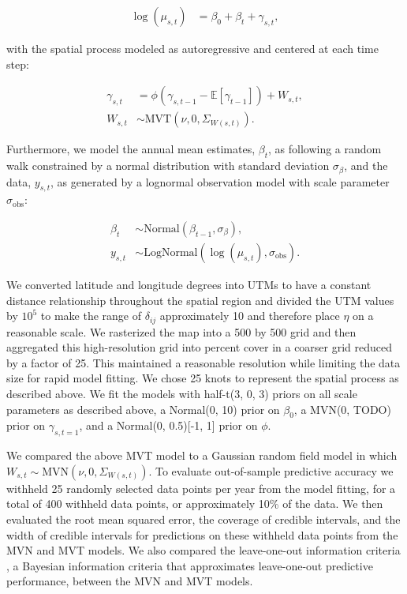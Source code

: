 \documentclass[12pt,english]{article}
\begin{document}
\begin{spacing}{1.25}
\begin{align}
  \log(\mu_{s,t}) &= \beta_0 + \beta_t + \gamma_{s,t},
  \end{align}

\noindent with the spatial process modeled as autoregressive
and centered at each time step:

\begin{align}
    \gamma_{s,t} &= \phi \left(\gamma_{s,t-1} -
      \mathbb{E}[\gamma_{t-1}]\right) + W_{s,t},\\ \label{eq:beetle-mu}
     W_{s,t} &\sim \mathrm{MVT}\left(\nu, 0, \Sigma_{W(s,t)}\right).
 \end{align}

\noindent Furthermore, we model the annual
mean estimates, $\beta_t$, as following a random walk
constrained by a normal distribution with standard deviation $\sigma_{\beta}$,
and the data, $y_{s,t}$, as generated by a lognormal observation model
with scale parameter $\sigma_{\mathrm{obs}}$:

 \begin{align}
 \beta_t &\sim \mathrm{Normal}\left( \beta_{t-1}, \sigma_{\beta} \right),\\
  y_{s,t} &\sim \mathrm{LogNormal} \left(  \log(\mu_{s,t}), \sigma_{\mathrm{obs}} \right).
 \end{align}

We converted latitude and longitude degrees into UTMs to have a constant
distance relationship throughout the spatial region and divided the UTM values
by $10^5$ to make the range of $\delta_{ij}$ approximately 10 and therefore
place $\eta$ on a reasonable scale.
We rasterized the map into a 500 by 500 grid
and then aggregated this high-resolution grid
into percent cover in a coarser grid reduced by a factor of 25.
This maintained a reasonable resolution
while limiting the data size for rapid model fitting.
We chose 25 knots to represent the spatial process as described above.
We fit the models with half-t(3, 0, 3) priors on all
scale parameters as described above,
a Normal(0, 10) prior on $\beta_0$,
a MVN(0, TODO) prior on $\gamma_{s,t=1}$,
and a Normal(0, 0.5)[-1, 1] prior on $\phi$.

We compared the above MVT
model to a Gaussian random field model in which
$W_{s,t} \sim \mathrm{MVN}\left(\nu, 0, \Sigma_{W(s,t)}\right)$.
To evaluate out-of-sample predictive accuracy we withheld
25 randomly selected data points
per year from the model fitting,
for a total of 400 withheld data points,
or approximately 10\% of the data.
We then evaluated the root mean squared error,
the coverage of credible intervals, and the width of credible intervals
for predictions on these withheld data points
from the MVN and MVT models.
We also compared the leave-one-out information criteria
\citep[LOOIC;][]{vehtari2016}, a Bayesian information criteria that approximates
leave-one-out predictive performance,
between the MVN and MVT models.


\end{spacing}
\end{document}
